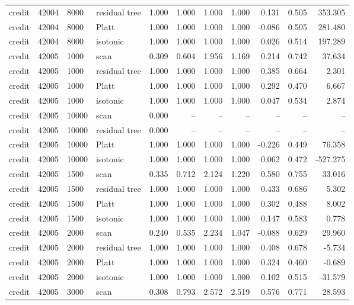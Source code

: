\begin{tabular}{lrllrrrrrrr}
credit & 42004 & 8000 & residual tree & 1.000 & 1.000 & 1.000 & 1.000 & 0.131 & 0.505 & 353.305 \\
credit & 42004 & 8000 & Platt & 1.000 & 1.000 & 1.000 & 1.000 & -0.086 & 0.505 & 281.480 \\
credit & 42004 & 8000 & isotonic & 1.000 & 1.000 & 1.000 & 1.000 & 0.026 & 0.514 & 197.289 \\
credit & 42005 & 1000 & scan & 0.309 & 0.604 & 1.956 & 1.169 & 0.214 & 0.742 & 37.634 \\
credit & 42005 & 1000 & residual tree & 1.000 & 1.000 & 1.000 & 1.000 & 0.385 & 0.664 & 2.301 \\
credit & 42005 & 1000 & Platt & 1.000 & 1.000 & 1.000 & 1.000 & 0.292 & 0.470 & 6.667 \\
credit & 42005 & 1000 & isotonic & 1.000 & 1.000 & 1.000 & 1.000 & 0.047 & 0.534 & 2.874 \\
credit & 42005 & 10000 & scan & 0.000 & -- & -- & -- & -- & -- & -- \\
credit & 42005 & 10000 & residual tree & 0.000 & -- & -- & -- & -- & -- & -- \\
credit & 42005 & 10000 & Platt & 1.000 & 1.000 & 1.000 & 1.000 & -0.226 & 0.449 & 76.358 \\
credit & 42005 & 10000 & isotonic & 1.000 & 1.000 & 1.000 & 1.000 & 0.062 & 0.472 & -527.275 \\
credit & 42005 & 1500 & scan & 0.335 & 0.712 & 2.124 & 1.220 & 0.580 & 0.755 & 33.016 \\
credit & 42005 & 1500 & residual tree & 1.000 & 1.000 & 1.000 & 1.000 & 0.433 & 0.686 & 5.302 \\
credit & 42005 & 1500 & Platt & 1.000 & 1.000 & 1.000 & 1.000 & 0.302 & 0.488 & 8.002 \\
credit & 42005 & 1500 & isotonic & 1.000 & 1.000 & 1.000 & 1.000 & 0.147 & 0.583 & 0.778 \\
credit & 42005 & 2000 & scan & 0.240 & 0.535 & 2.234 & 1.047 & -0.088 & 0.629 & 29.960 \\
credit & 42005 & 2000 & residual tree & 1.000 & 1.000 & 1.000 & 1.000 & 0.408 & 0.678 & -5.734 \\
credit & 42005 & 2000 & Platt & 1.000 & 1.000 & 1.000 & 1.000 & 0.324 & 0.460 & -0.689 \\
credit & 42005 & 2000 & isotonic & 1.000 & 1.000 & 1.000 & 1.000 & 0.102 & 0.515 & -31.579 \\
credit & 42005 & 3000 & scan & 0.308 & 0.793 & 2.572 & 2.519 & 0.576 & 0.771 & 28.593 \\

\end{tabular}
